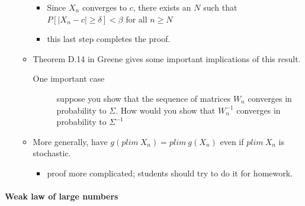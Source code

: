 \begin{enumerate}
\begin{itemize}
\begin{itemize}
\item Since $X_n$ converges to $c$, there exists an $N$
              such that $P[|X_n - c| \geq \delta] < \beta$ for
              all $n \geq N$
\item this last step completes the proof.
\end{itemize}
\item Theorem D.14 in Greene gives some important implications of
            this result.
\begin{description}
\item[One important case] suppose you show that the sequence of
                 matrices $W_n$ converges in probability to $\Sigma$.
                 How would you show that $W_n^{-1}$ converges in
                 probability to $\Sigma^{-1}$
\end{description}
\item More generally, have $g(plim\ X_n) = plim\ g(X_n)$ even if
            $plim\ X_n$ is stochastic.
\begin{itemize}
\item proof more complicated; students should try to do it for
              homework.
\end{itemize}
\end{itemize}
\end{enumerate}
\paragraph{Weak law of large numbers}
\label{sec-1-3-2}

